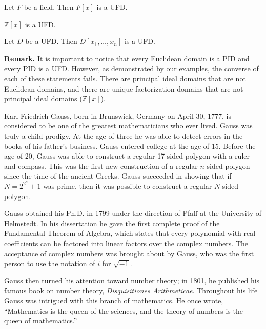 \begin{corollary}
Let $F$ be a field. Then $F[x]$ is a UFD.
\end{corollary}


\begin{corollary}\label{domains:int_poly_UFD_corollary}
${\mathbb Z}[x]$ is a UFD.
\end{corollary}


\begin{corollary}
Let $D$ be a UFD. Then $D[x_1, \ldots, x_n]$ is a UFD. 
\end{corollary} 



\noindent \textbf{Remark.}
It is important to notice that every Euclidean domain is a PID and
every PID is a UFD. However, as demonstrated by our examples, the
converse of each of these statements fails.  There are principal
ideal domains that are not Euclidean domains, and there are unique
factorization domains that are not principal ideal domains (${\mathbb
Z}[x]$). 

\histhead

\noindent
Karl Friedrich Gauss, born in Brunswick, Germany on April 30, 1777, is considered to be one of the greatest
mathematicians who ever lived.  Gauss was truly a child prodigy.  At the age of three he was able to detect errors in the books of his father's
business.  Gauss entered college at the age of 15.  Before the age of 20, Gauss was able to construct a regular 17-sided polygon with a ruler
and compass.  This was the first new construction of a regular $n$-sided polygon since the time of the ancient Greeks.  Gauss succeeded in showing that if $N= 2^{2^n}+1$ was prime, then it was possible to construct a regular $N$-sided polygon.  

Gauss obtained his Ph.D. in 1799 under the direction of Pfaff at the University of Helmstedt.  In his dissertation he gave the first complete proof of the Fundamental Theorem of Algebra, which states that every polynomial with real coefficients can be factored into linear factors over the complex numbers.  The acceptance of complex numbers was brought about by Gauss, who was the first person to use the notation of $i$ for $\sqrt{-1}$. 

Gauss then turned his attention toward number theory; in 1801, he published his famous book on number theory, \textit{Disquisitiones
Arithmeticae}.  Throughout his life Gauss was intrigued with this branch of mathematics.  He once wrote, ``Mathematics is the queen of the sciences, and the theory of numbers is the queen of mathematics.'' 

